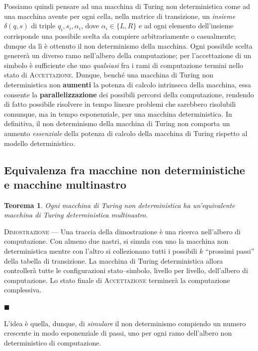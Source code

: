 \documentclass[10pt]{\classname}
\theoremstyle{newlinethm}
\newtheorem{thm}{Teorema}[section]
\theoremstyle{theorem}
\theoremstyle{definition}
\theoremstyle{definition}
\theoremstyle{definition}
\theoremstyle{definition}
\begin{document}
Possiamo quindi pensare ad una macchina di Turing non deterministica
come ad una macchina avente per ogni cella, nella matrice di transizione, un
\emph{insieme} $\delta(q,s)$ di triple $q_i, s_i, \alpha_i$, dove $\alpha_i \in
\{L,R\}$ e ad ogni elemento dell'insieme corrisponde una possibile scelta da
compiere arbitrariamente o casualmente; dunque da lì è ottenuto il non
determinismo della macchina. Ogni possibile scelta genererà un diverso ramo
nell'albero della computazione; per l'accettazione di un simbolo è
sufficiente che uno \emph{qualsiasi} fra i rami di computazione termini nello
stato di \textsc{Accettazione}. Dunque, benché una macchina di Turing non
deterministica non \textbf{aumenti} la potenza di calcolo intrinseca della
macchina, essa consente la \textbf{parallelizzazione} dei possibili percorsi
della computazione, rendendo di fatto possibile risolvere in tempo lineare
problemi che sarebbero risolubili comunque, ma in tempo esponenziale, per una
macchina deterministica. In definitiva, il non determinismo della macchina di Turing non comporta un aumento \emph{essenziale} della potenza di calcolo della macchina di Turing rispetto al modello deterministico.

\subsection{Equivalenza fra macchine non deterministiche e macchine multinastro}

\begin{thm}
    Ogni macchina di Turing non deterministica ha un'equivalente macchina di
    Turing deterministica multinastro.
\end{thm}

\textsc{Dimostrazione} --- Una traccia della dimostrazione è una ricerca
nell'albero di computazione. Con almeno due nastri, si simula con uno la
macchina non deterministica mentre con l'altro si collezionano tutti i
possibili $k$ ``prossimi passi'' della tabella di transizione. La macchina di
Turing deterministica allora controllerà tutte le configurazioni
stato--simbolo, livello per livello, dell'albero di computazione. Lo stato
finale di \textsc{Accettazione } terminerà la computazione complessiva.

\begin{flushright}
$\blacksquare$
\end{flushright}

L'idea è quella, dunque, di \emph{simulare} il non determinismo compiendo un
numero crescente in modo esponenziale di passi, uno per ogni ramo dell'albero
non deterministico di computazione.
\end{document}
